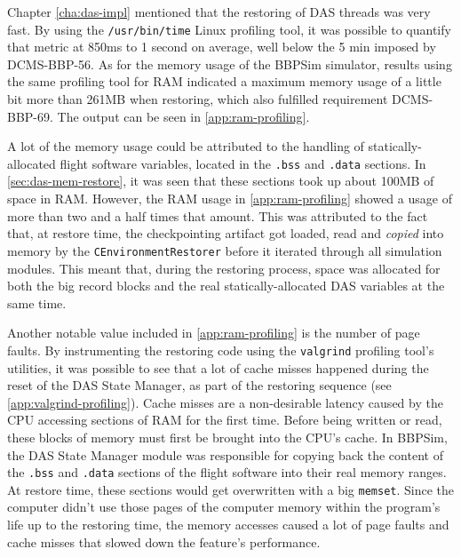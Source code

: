 {Chapter \ref{cha:das-impl} mentioned that the restoring of DAS threads was very fast. By using the \texttt{/usr/bin/time} Linux profiling tool, it was possible to quantify that metric at  850ms to 1 second on average, well below the 5 min imposed by DCMS-BBP-56. As for the memory usage of the BBPSim simulator, results using the same profiling tool for RAM indicated a maximum memory usage of a little bit more than 261MB when restoring, which also fulfilled requirement DCMS-BBP-69. The output can be seen in \autoref{app:ram-profiling}. 

A lot of the memory usage could be attributed to the handling of statically-allocated flight software variables, located in the \texttt{.bss} and \texttt{.data} sections. In \autoref{sec:das-mem-restore}, it was seen that these sections took up about 100MB of space in RAM. However, the RAM usage in \autoref{app:ram-profiling} showed a usage of more than two and a half times that amount. This was attributed to the fact that, at restore time, the checkpointing artifact got loaded, read and \textit{copied} into memory by the \texttt{CEnvironmentRestorer} before it iterated through all simulation modules. This meant that, during the restoring process, space was allocated for both the big record blocks and the real statically-allocated DAS variables at the same time. 

Another notable value included in \autoref{app:ram-profiling} is the number of page faults. By instrumenting the restoring code using the \texttt{valgrind} profiling tool's utilities, it was possible to see that a lot of cache misses happened during the reset of the DAS State Manager, as part of the restoring sequence (see \autoref{app:valgrind-profiling}). Cache misses are a non-desirable latency caused by the CPU accessing sections of RAM for the first time. Before being written or read, these blocks of memory must first be brought into the CPU's cache\cite{misc:cache-misses}. In BBPSim, the DAS State Manager module was responsible for copying back the content of the \texttt{.bss} and \texttt{.data} sections of the flight software into their real memory ranges. At restore time, these sections would get overwritten with a big \texttt{memset}. Since the computer didn't use those pages of the computer memory within the program's life up to the restoring time, the memory accesses caused a lot of page faults and cache misses that slowed down the feature's performance.

}